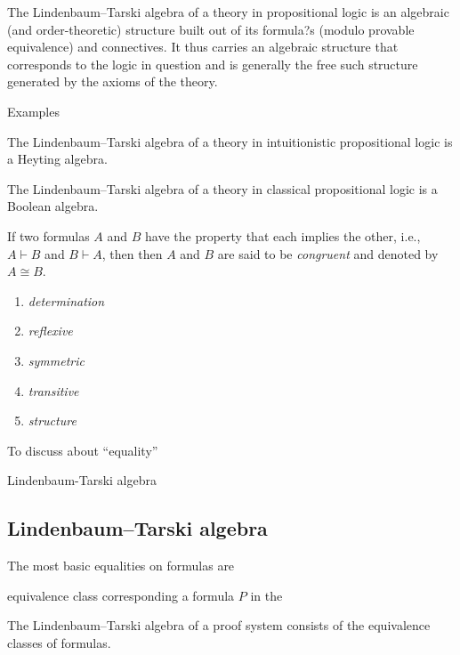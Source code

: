 The Lindenbaum–Tarski algebra of a theory in propositional logic is an algebraic (and order-theoretic) structure built out of its formula?s (modulo provable equivalence) and connectives. It thus carries an algebraic structure that corresponds to the logic in question and is generally the free such structure generated by the axioms of the theory.

Examples

The Lindenbaum–Tarski algebra of a theory in intuitionistic propositional logic is a Heyting algebra.

The Lindenbaum–Tarski algebra of a theory in classical propositional logic is a Boolean algebra.




If two formulas $A$ and $B$ have the property that each implies the other, i.e., $A \vdash B$ and $B \vdash A$, 
then then $A$ and $B$ are said to be {\it congruent} 
and denoted by $A \cong B$. 


\begin{enumerate}
\item {\it determination} \cite{Lincoln90simple,Lincoln94ll,Lincoln94tcs}
\item {\it reflexive}
\item {\it symmetric}
\item {\it transitive}
\item {\it structure}
\end{enumerate}


\newcommand{\LTCapprox}{\approx}

To discuss about  ``equality''

Lindenbaum-Tarski algebra 

\subsection{Lindenbaum–Tarski algebra}

The most basic equalities on formulas are

equivalence class corresponding a formula $P$ in the 


The Lindenbaum–Tarski algebra of a proof system consists of the equivalence classes of formulas. 

